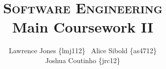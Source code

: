 \documentclass[11pt]{article}
\title{\textsc{Software Engineering}\\Main Coursework II}
\author{Lawrence Jones \{lmj112\} \  Alice Sibold \{as4712\} \\
        Joshua Coutinho \{jrc12\}}
\date{}
\begin{document}
\maketitle




\medskip


\newpage
\end{document}
